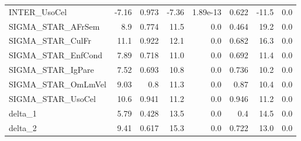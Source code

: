 \begin{tabular}{lrrrrrrr}
INTER\_UsoCel       &  -7.16 &    0.973 &   -7.36 & 1.89e-13 &         0.622 &        -11.5 &           0.0 \\
SIGMA\_STAR\_AFrSem  &    8.9 &    0.774 &    11.5 &      0.0 &         0.464 &         19.2 &           0.0 \\
SIGMA\_STAR\_CulFr   &   11.1 &    0.922 &    12.1 &      0.0 &         0.682 &         16.3 &           0.0 \\
SIGMA\_STAR\_EnfCond &   7.89 &    0.718 &    11.0 &      0.0 &         0.692 &         11.4 &           0.0 \\
SIGMA\_STAR\_IgPare  &   7.52 &    0.693 &    10.8 &      0.0 &         0.736 &         10.2 &           0.0 \\
SIGMA\_STAR\_OmLmVel &   9.03 &      0.8 &    11.3 &      0.0 &          0.87 &         10.4 &           0.0 \\
SIGMA\_STAR\_UsoCel  &   10.6 &    0.941 &    11.2 &      0.0 &         0.946 &         11.2 &           0.0 \\
delta\_1            &   5.79 &    0.428 &    13.5 &      0.0 &           0.4 &         14.5 &           0.0 \\
delta\_2            &   9.41 &    0.617 &    15.3 &      0.0 &         0.722 &         13.0 &           0.0 \\
\bottomrule
\end{tabular}

